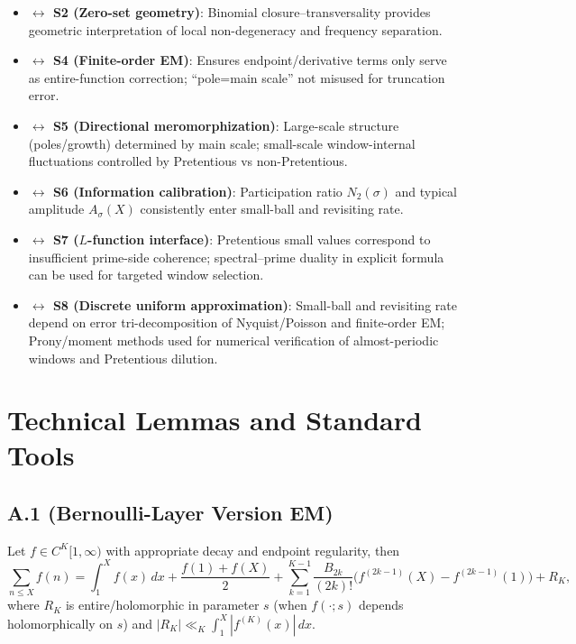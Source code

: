 \documentclass[11pt,a4paper]{article}
\theoremstyle{remark}
\begin{document}
\begin{itemize}
\item \textbf{$\leftrightarrow$ S2 (Zero-set geometry)}: Binomial closure--transversality provides geometric interpretation of local non-degeneracy and frequency separation.

\item \textbf{$\leftrightarrow$ S4 (Finite-order EM)}: Ensures endpoint/derivative terms only serve as entire-function correction; ``pole=main scale'' not misused for truncation error.

\item \textbf{$\leftrightarrow$ S5 (Directional meromorphization)}: Large-scale structure (poles/growth) determined by main scale; small-scale window-internal fluctuations controlled by Pretentious vs non-Pretentious.

\item \textbf{$\leftrightarrow$ S6 (Information calibration)}: Participation ratio $N_2(\sigma)$ and typical amplitude $A_\sigma(X)$ consistently enter small-ball and revisiting rate.

\item \textbf{$\leftrightarrow$ S7 ($L$-function interface)}: Pretentious small values correspond to insufficient prime-side coherence; spectral--prime duality in explicit formula can be used for targeted window selection.

\item \textbf{$\leftrightarrow$ S8 (Discrete uniform approximation)}: Small-ball and revisiting rate depend on error tri-decomposition of Nyquist/Poisson and finite-order EM; Prony/moment methods used for numerical verification of almost-periodic windows and Pretentious dilution.
\end{itemize}

\appendix

\section{Technical Lemmas and Standard Tools}

\subsection{A.1 (Bernoulli-Layer Version EM)}

Let $f\in C^{K}[1,\infty)$ with appropriate decay and endpoint regularity, then
\begin{equation}
\sum_{n\le X}f(n)=\int_{1}^{X}f(x)\,dx+\frac{f(1)+f(X)}{2}
+\sum_{k=1}^{K-1}\frac{B_{2k}}{(2k)!}\bigl(f^{(2k-1)}(X)-f^{(2k-1)}(1)\bigr)+R_K,
\end{equation}
where $R_K$ is entire/holomorphic in parameter $s$ (when $f(\cdot;s)$ depends holomorphically on $s$) and $|R_K|\ll_K \int_{1}^{X}|f^{(K)}(x)|\,dx$.
\end{document}
